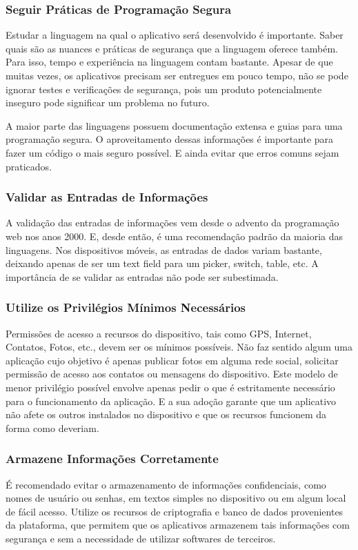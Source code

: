 \subsubsection{Seguir Práticas de Programação Segura}
Estudar a linguagem na qual o aplicativo será desenvolvido é importante. Saber quais são as nuances e práticas de segurança que a linguagem oferece também. Para isso, tempo e experiência na linguagem contam bastante. Apesar de que muitas vezes, os aplicativos precisam ser entregues em pouco tempo, não se pode ignorar testes e verificações de segurança, pois um produto potencialmente inseguro pode significar um problema no futuro. 

A maior parte das linguagens possuem documentação extensa e guias para uma programação segura. O aproveitamento dessas informações é importante para fazer um código o mais seguro possível. E ainda evitar que erros comuns sejam praticados. \cite{DWIVEDI} 
\subsubsection{Validar as Entradas de Informações}
A validação das entradas de informações vem desde o advento da programação web nos anos 2000. E, desde então, é uma recomendação padrão da maioria das linguagens. Nos dispositivos móveis, as entradas de dados variam bastante, deixando apenas de ser um text field para um picker, switch, table, etc. A importância de se validar as entradas não pode ser subestimada.\cite{DWIVEDI}

\subsubsection{ Utilize os Privilégios Mínimos Necessários}
Permissões de acesso a recursos do dispositivo, tais como GPS, Internet, Contatos, Fotos, etc., devem ser os mínimos possíveis. Não faz sentido algum uma aplicação cujo objetivo é apenas publicar fotos em alguma rede social, solicitar permissão de acesso aos contatos ou mensagens do dispositivo. Este modelo de menor privilégio possível envolve apenas pedir o que é estritamente necessário para o funcionamento da aplicação. E a sua adoção garante que um aplicativo não afete os outros instalados no dispositivo e que os recursos funcionem da forma como deveriam. \cite{DWIVEDI}

\subsubsection{Armazene Informações Corretamente}
É recomendado evitar o armazenamento de informações confidenciais, como nomes de usuário ou senhas, em textos simples no dispositivo ou em algum local de fácil acesso. Utilize os recursos de criptografia e banco de dados provenientes da plataforma, que permitem que os aplicativos armazenem tais informações com segurança e sem a necessidade de utilizar softwares de terceiros. \cite{DWIVEDI}

